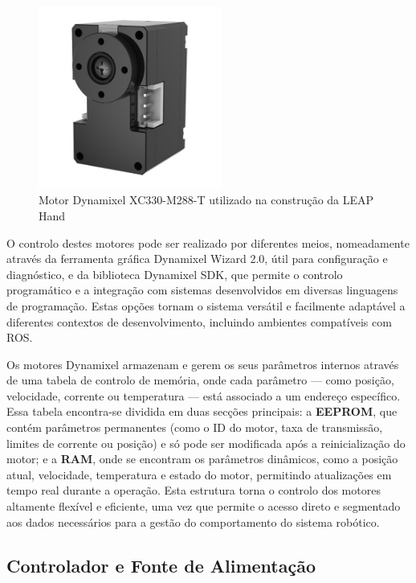 \begin{figure}[H]
    \centering
    \includegraphics[height=6cm]{figs/chapter3/motor.jpg}
    \caption{Motor Dynamixel XC330-M288-T utilizado na construção da LEAP Hand\cite{shaw2023leaphand} }
    \label{fig:motor}
    
\end{figure}

O controlo destes motores pode ser realizado por diferentes meios, nomeadamente através da ferramenta gráfica Dynamixel Wizard 2.0, útil para configuração e diagnóstico, e da biblioteca Dynamixel SDK, que permite o controlo programático e a integração com sistemas desenvolvidos em diversas linguagens de programação. Estas opções tornam o sistema versátil e facilmente adaptável a diferentes contextos de desenvolvimento, incluindo ambientes compatíveis com \ac{ROS}.

Os motores Dynamixel armazenam e gerem os seus parâmetros internos através de uma tabela de controlo de memória, onde cada parâmetro — como posição, velocidade, corrente ou temperatura — está associado a um endereço específico. Essa tabela encontra-se dividida em duas secções principais: a \textbf{EEPROM}, que contém parâmetros permanentes (como o ID do motor, taxa de transmissão, limites de corrente ou posição) e só pode ser modificada após a reinicialização do motor; e a \textbf{RAM}, onde se encontram os parâmetros dinâmicos, como a posição atual, velocidade, temperatura e estado do motor, permitindo atualizações em tempo real durante a operação. Esta estrutura torna o controlo dos motores altamente flexível e eficiente, uma vez que permite o acesso direto e segmentado aos dados necessários para a gestão do comportamento do sistema robótico.

\subsection{Controlador e Fonte de Alimentação}

